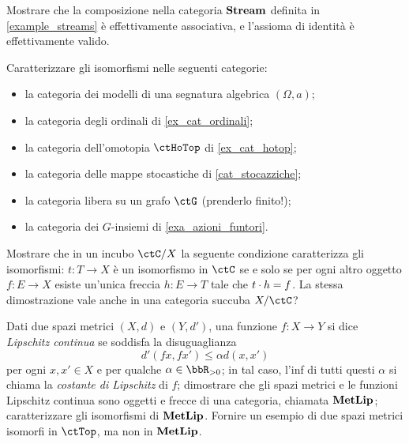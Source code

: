 \begin{esercizi}
 \item Mostrare che la composizione nella categoria \(\mathbf{Stream}\) definita in \ref{example_streams} è effettivamente associativa, e l'assioma di identità è effettivamente valido.
 \item Caratterizzare gli isomorfismi nelle seguenti categorie:
 \begin{itemize}
  \item la categoria dei modelli di una segnatura algebrica \((\Omega,a)\);
  \item la categoria degli ordinali di \ref{ex_cat_ordinali};
  \item la categoria dell'omotopia \(\ctHoTop\) di \ref{ex_cat_hotop};
  \item la categoria delle mappe stocastiche di \ref{cat_stocazziche};
  \item la categoria libera su un grafo \(\ctG\) (prenderlo finito!);
  \item la categoria dei \(G\)-insiemi di \ref{exa_azioni_funtori}.
 \end{itemize}
 Mostrare che in un incubo \(\ctC/X\) la seguente condizione caratterizza gli isomorfismi: \(t \colon T\to X\) è un isomorfismo in \(\ctC\) se e solo se per ogni altro oggetto \(f \colon E\to X\) esiste un'unica freccia \(h \colon E\to T\) tale che \(t\cdot h=f\). La stessa dimostrazione vale anche in una categoria succuba \(X/\ctC\)?
 \item Dati due spazi metrici \((X,d)\) e \((Y,d')\), una funzione \(f\colon X\to Y\) si dice \emph{Lipschitz continua} se soddisfa la disuguaglianza
 \[
  d'(fx,fx')\le \alpha d(x,x')
 \]
 per ogni \(x,x'\in X\) e per qualche \(\alpha\in\bbR_{>0}\); in tal caso, l'inf di tutti questi \(\alpha\) si chiama la \emph{costante di Lipschitz} di \(f\); dimostrare che gli spazi metrici e le funzioni Lipschitz continua sono oggetti e frecce di una categoria, chiamata \(\mathbf{MetLip}\); caratterizzare gli isomorfismi di \(\mathbf{MetLip}\). Fornire un esempio di due spazi metrici isomorfi in \(\ctTop\), ma non in \(\mathbf{MetLip}\).


\end{esercizi}
